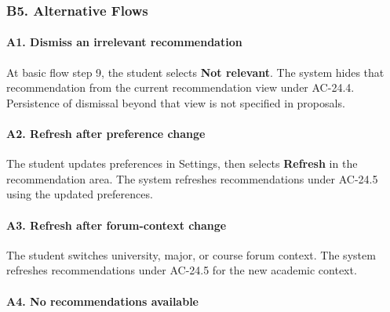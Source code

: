 \documentclass[12pt]{article}
\begin{document}
\hypertarget{sec:b5-alternative-flows}{}
\subsubsection*{B5. Alternative Flows}
\par\medskip

\hypertarget{sec:a1-dismiss-an-irrelevant-recommendation}{}
\paragraph*{A1. Dismiss an irrelevant recommendation}
\par\medskip

At basic flow step 9, the student selects \textbf{Not relevant}. The system hides that recommendation from the current recommendation view under AC-24.4. Persistence of dismissal beyond that view is not specified in proposals.
\par\medskip

\hypertarget{sec:a2-refresh-after-preference-change}{}
\paragraph*{A2. Refresh after preference change}
\par\medskip

The student updates preferences in Settings, then selects \textbf{Refresh} in the recommendation area. The system refreshes recommendations under AC-24.5 using the updated preferences.
\par\medskip

\hypertarget{sec:a3-refresh-after-forum-context-change}{}
\paragraph*{A3. Refresh after forum-context change}
\par\medskip

The student switches university, major, or course forum context. The system refreshes recommendations under AC-24.5 for the new academic context.
\par\medskip

\hypertarget{sec:a4-no-recommendations-available}{}
\paragraph*{A4. No recommendations available}
\par\medskip
\end{document}
